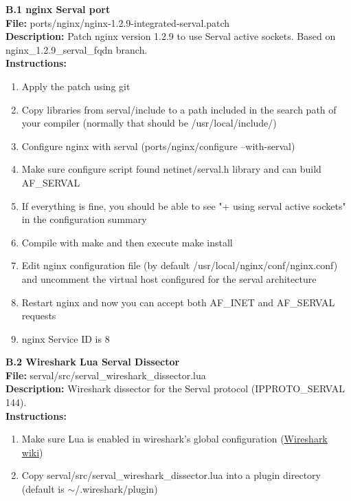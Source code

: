 \documentclass[12pt,a4paper,oneside]{article}
\begin{document}
\newpage
{}
{}
{\huge \bf \noindent B.1 nginx Serval port}\\[0.5cm]
\textbf{File:} ports/nginx/nginx-1.2.9-integrated-serval.patch\\
\textbf{Description:} Patch nginx version 1.2.9 to use Serval active sockets. Based on nginx\_1.2.9\_serval\_fqdn branch.\\
\textbf{Instructions: }
\begin{enumerate} \itemsep1pt \parskip0pt 
	\item Apply the patch using git
	\item Copy libraries from serval/include to a path included in the search path of your compiler (normally that should be /usr/local/include/)
	\item Configure nginx with serval (ports/nginx/configure --with-serval)
	\item Make sure configure script found netinet/serval.h library and can build AF\_SERVAL
	\item If everything is fine, you should be able to see "+ using serval active sockets" in the configuration summary
	\item Compile with make and then execute make install
	\item Edit nginx configuration file (by default /usr/local/nginx/conf/nginx.conf) and uncomment the virtual host configured for the serval architecture
	\item Restart nginx and now you can accept both AF\_INET and AF\_SERVAL requests
	\item nginx Service ID is 8\\[0.5cm]
\end{enumerate}


\newpage
{}
{}
{\huge \bf \noindent B.2 Wireshark Lua Serval Dissector}\\[0.5cm]
\textbf{File:} serval/src/serval\_wireshark\_dissector.lua\\
\textbf{Description:} Wireshark dissector for the Serval protocol (IPPROTO\_SERVAL 144).\\
\textbf{Instructions: }
\begin{enumerate} \itemsep1pt \parskip0pt 
	\item Make sure Lua is enabled in wireshark's global configuration (\href{http://wiki.wireshark.org/Lua}{Wireshark wiki})
	\item Copy serval/src/serval\_wireshark\_dissector.lua into a plugin directory (default is $\sim$/.wireshark/plugin)\\[0.5cm]
\end{enumerate}

\end{document}
